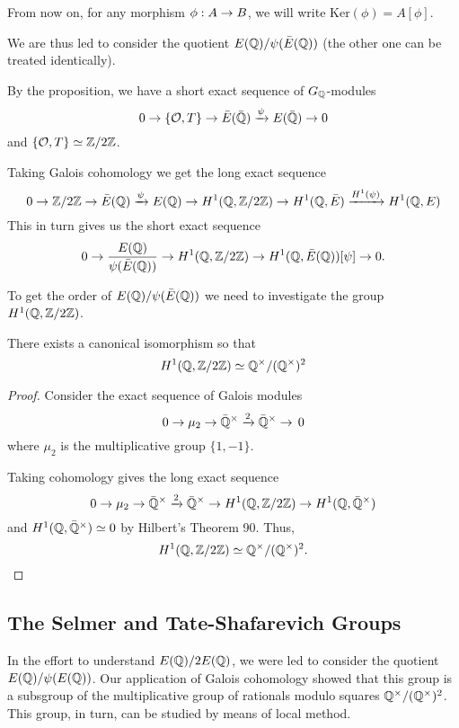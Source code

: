 \documentclass[12pt, a4paper]{amsart}
\begin{document}
\begin{defn}
  From now on, for any morphism $\phi : A \rightarrow B$, we
  will write $\text{Ker}(\phi) = A[\phi]$.
\end{defn}

We are thus led to consider the quotient $E({\mathbb Q}) / \psi(\bar{E}({\mathbb Q}))$ (the
other one can be treated identically).

By the proposition, we have a short exact sequence of $G_{{\mathbb Q}}$-modules
\[ 0 \rightarrow \{{\mathcal O}, T\} \rightarrow \bar{E}(\bar{{\mathbb Q}}) \xrightarrow[]{\psi}
  E(\bar{{\mathbb Q}})
  \rightarrow 0\]
and $\{{\mathcal O}, T\} \simeq {\mathbb Z}/2{\mathbb Z}$.

Taking Galois cohomology we get the long exact sequence
\[ 0 \rightarrow {\mathbb Z} / 2{\mathbb Z} \rightarrow \bar{E}({\mathbb Q}) \xrightarrow[]{\psi} E({\mathbb Q})
  \rightarrow H^1({\mathbb Q}, {\mathbb Z}/2{\mathbb Z}) \rightarrow H^1({\mathbb Q}, \bar{E}) \xrightarrow{H^1(\psi)}
  H^1({\mathbb Q}, E)\]
This in turn gives us the short exact sequence
\[ 0 \rightarrow \frac{E({\mathbb Q})}{\psi(\bar{E} ({\mathbb Q}))} \rightarrow
  H^1({\mathbb Q}, {\mathbb Z} / 2{\mathbb Z}) \rightarrow H^1({\mathbb Q}, \bar{E}({\mathbb Q}))[\psi] \rightarrow 0.\]

To get the order of $E({\mathbb Q}) / \psi(\bar{E}({\mathbb Q}))$ we need to investigate the group
$H^1({\mathbb Q}, {\mathbb Z}/2{\mathbb Z})$.

\begin{prop}
  There exists a canonical isomorphism so that
  \[H^1({\mathbb Q}, {\mathbb Z}/2{\mathbb Z}) \simeq {\mathbb Q}^{\times} / ({\mathbb Q}^{\times})^2\]
\end{prop}
\begin{proof}
Consider the exact sequence of Galois modules
\[0 \rightarrow \mu_2 \rightarrow \bar{{\mathbb Q}}^{\times} \xrightarrow[]{2} \bar{{\mathbb Q}}^{\times} \rightarrow
  \, 0 \]
where $\mu_2$ is the multiplicative group $\{1, -1\}.$
 
Taking cohomology gives the long exact sequence
\[ 0 \rightarrow \mu_2 \rightarrow \bar{{\mathbb Q}}^{\times} \xrightarrow[]{2} \bar{{\mathbb Q}}^{\times} \rightarrow H^1({\mathbb Q}, {\mathbb Z}/2{\mathbb Z})
  \rightarrow H^1({\mathbb Q}, \bar{{\mathbb Q}}^{\times})\]
and $H^1({\mathbb Q}, \bar{{\mathbb Q}}^{\times}) \simeq 0$ by Hilbert's Theorem 90. Thus,
\[H^1({\mathbb Q}, {\mathbb Z}/2{\mathbb Z}) \simeq {\mathbb Q}^{\times}/({\mathbb Q}^{\times})^2. \]
\end{proof}

\subsection{The Selmer and Tate-Shafarevich Groups}

In the effort to understand $E({\mathbb Q})/2E({\mathbb Q})$, we were led to consider the quotient
$E({\mathbb Q}) / \psi(E({\mathbb Q}))$. Our application of Galois cohomology showed that this
group is a subsgroup of the multiplicative group of rationals modulo squares
${\mathbb Q}^{\times} / ({\mathbb Q}^{\times})^2$. This group, in turn, can be studied by means
of local method.
\end{document}
